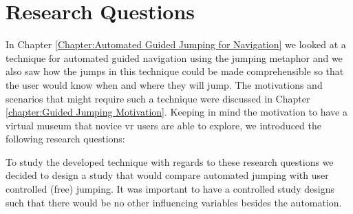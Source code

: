 \label{Chapter:Design and Procedure of the User Study}
\section{Research Questions}
\label{section:DUS Research Questions}
In Chapter \ref{Chapter:Automated Guided Jumping for Navigation} we looked at a technique for automated guided navigation using the jumping metaphor and we also saw how the jumps in this technique could be made comprehensible so that the user would know when and where they will jump. The motivations and scenarios that might require such a technique were discussed in Chapter \ref{chapter:Guided Jumping Motivation}. Keeping in mind the motivation to have a virtual museum that novice \acrshort{vr} users are able to explore, we introduced the following research questions:

To study the developed technique with regards to these research questions we decided to design a study that would compare automated jumping with user controlled (free) jumping. It was important to have a controlled study designs such that there would be no other influencing variables besides the automation.